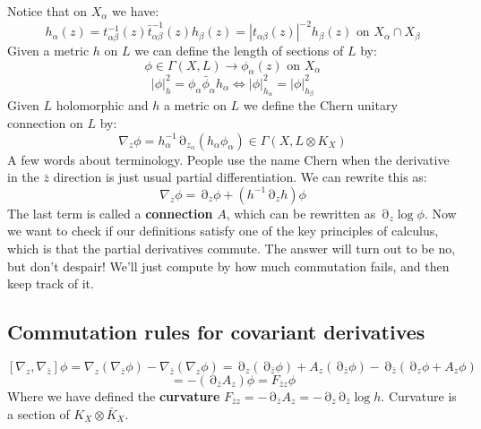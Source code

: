 \documentclass[12 pt]{article}
\DeclareMathOperator {\p} {\partial}
\theoremstyle{plain}
\theoremstyle{definition}
\theoremstyle{remark}
\begin{document}
Notice that on $X_{\alpha}$ we have:
\[    h_{\alpha} (z) = t_{\alpha \beta}^{-1} (z) \bar t_{\alpha \beta}^{-1} (z) h_{\beta}(z) = |t_{\alpha \beta} (z)|^{-2}h_{\beta}(z)  \text { on } X_{\alpha} \cap X_{\beta} \]
Given a metric $h$ on $L$ we can define the length of sections of $L$ by:
\[   \phi \in \Gamma(X,L) \to \phi_{\alpha} (z) \text{ on } X_{\alpha}   \]
\[     |\phi|^2_{h} = \phi_{\alpha} \bar \phi_{\alpha} h_{\alpha}  \Leftrightarrow  |\phi|^2_{h_{\alpha}} = |\phi|^2_{h_{\beta}} \]
Given $L$ holomorphic and $h$ a metric on $L$ we define the Chern unitary connection on $L$ by:
\[    \nabla_z \phi = h_{\alpha}^{-1} \p_{z_{\alpha}} (h_{\alpha} \phi_{\alpha})  \in \Gamma(X, L \otimes K_X)  \]
A few words about terminology. People use the name Chern when the derivative in the $\bar z$ direction is just usual partial differentiation. We can rewrite this as:
\[       \nabla_z \phi = \p_z \phi + (h^{-1} \p_z h) \phi     \]
The last term is called a \textbf{connection} $A$, which can be rewritten as $\p_z \log\phi$. Now we want to check if our definitions satisfy one of the key principles of calculus, which is that the partial derivatives commute. The answer will turn out to be no, but don't despair! We'll just compute by how much commutation fails, and then keep track of it.

\subsection*{Commutation rules for covariant derivatives}
\[ [\nabla_z , \nabla_{\bar z}] \phi = \nabla_z (\nabla_{\bar z} \phi) - \nabla_{\bar z} (\nabla_z \phi)  = \p_z(\p_{\bar z} \phi) + A_z (\p_{\bar z} \phi) - \p_{\bar z} (\p_z \phi + A_z \phi)  \]
\[     =  - (\p_{\bar z} A_z) \phi = F_{\bar z z} \phi     \]
Where we have defined the \textbf{curvature} $F_{\bar z z} =  - \p_{\bar z} A_z = - \p_z \p_{\bar z} \log h$. Curvature is a section of $K_X \otimes \bar K_X$.
\end{document}

